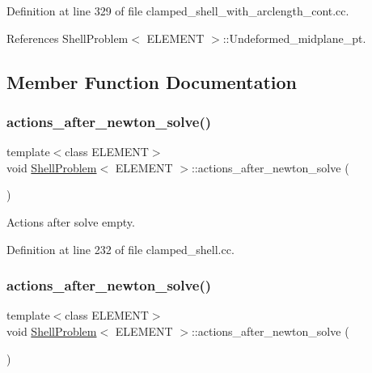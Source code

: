 Definition at line 329 of file clamped\+\_\+shell\+\_\+with\+\_\+arclength\+\_\+cont.\+cc.



References Shell\+Problem$<$ E\+L\+E\+M\+E\+N\+T $>$\+::\+Undeformed\+\_\+midplane\+\_\+pt.



\subsection{Member Function Documentation}
\mbox{\label{classShellProblem_a65636b791c99203ecbb09ba2a2eec214}} 
\subsubsection{\texorpdfstring{actions\+\_\+after\+\_\+newton\+\_\+solve()}{actions\_after\_newton\_solve()}\hspace{0.1cm}{\footnotesize\ttfamily [1/2]}}
{\footnotesize\ttfamily template$<$class E\+L\+E\+M\+E\+NT$>$ \\
void \hyperlink{classShellProblem}{Shell\+Problem}$<$ E\+L\+E\+M\+E\+NT $>$\+::actions\+\_\+after\+\_\+newton\+\_\+solve (\begin{DoxyParamCaption}{ }\end{DoxyParamCaption})\hspace{0.3cm}{\ttfamily [inline]}}



Actions after solve empty. 



Definition at line 232 of file clamped\+\_\+shell.\+cc.

\mbox{\label{classShellProblem_a65636b791c99203ecbb09ba2a2eec214}} 
\subsubsection{\texorpdfstring{actions\+\_\+after\+\_\+newton\+\_\+solve()}{actions\_after\_newton\_solve()}\hspace{0.1cm}{\footnotesize\ttfamily [2/2]}}
{\footnotesize\ttfamily template$<$class E\+L\+E\+M\+E\+NT$>$ \\
void \hyperlink{classShellProblem}{Shell\+Problem}$<$ E\+L\+E\+M\+E\+NT $>$\+::actions\+\_\+after\+\_\+newton\+\_\+solve (\begin{DoxyParamCaption}{ }\end{DoxyParamCaption})\hspace{0.3cm}{\ttfamily [inline]}}



